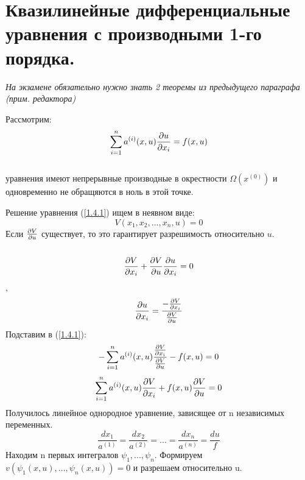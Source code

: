 \documentclass[../main.tex]{subfiles}
\begin{document}
\section{Квазилинейные дифференциальные уравнения с производными 1-го порядка.}


\textit{На экзамене обязательно нужно знать 2 теоремы из предыдущего параграфа (прим. редактора)}


\par Рассмотрим:
\begin{equation}\label{1.4.1}
	\sum_{i=1}^{n}a^{(i)}(x,u)\frac{\partial u}{\partial x_i}=f(x,u)
\end{equation}
\\ уравнения имеют непрерывные производные в окрестности $\Omega(x^{(0)})$ и одновременно не обращяются в ноль в этой точке.\\

\par Решение уравнения (\ref{1.4.1}) ищем в неявном виде:
$$V(x_1,x_2,...,x_n,u)=0$$
Если $\frac{\partial V}{\partial u}$ существует, то это гарантирует разрешимость относительно $u$.
\\ \\
\[\frac{\partial V}{\partial x_i}+\frac{\partial V}{\partial u}\frac{\partial u}{\partial x_i} = 0\],
\[ \frac{\partial u}{\partial x_i} = \frac{-\frac{\partial V}{\partial x_i}}{\frac{\partial V}{\partial u}}\] 
Подставим в (\ref{1.4.1}):\\

$$-\sum_{i=1}^{n}a^{(i)}(x,u)\frac{\frac{\partial V}{\partial x_i}}{\frac{\partial V}{\partial u}}-f(x,u)=0$$
$$\sum_{i=1}^{n}a^{(i)}(x,u)\frac{\partial V}{\partial x_i}+f(x,u)\frac{\partial V}{\partial u} = 0$$
Получилось линейное однородное уравнение, зависящее от n независимых переменных.
$$\frac{dx_1}{a^{(1)}}=\frac{dx_2}{a^{(2)}}=...=\frac{dx_n}{a^{(n)}}=\frac{du}{f}$$
Находим n первых интегралов $\psi_1,...,\psi_n$. Формируем $v(\psi_1(x,u),...,\psi_n(x,u))=0$ и разрешаем относительно u.
\end{document}
